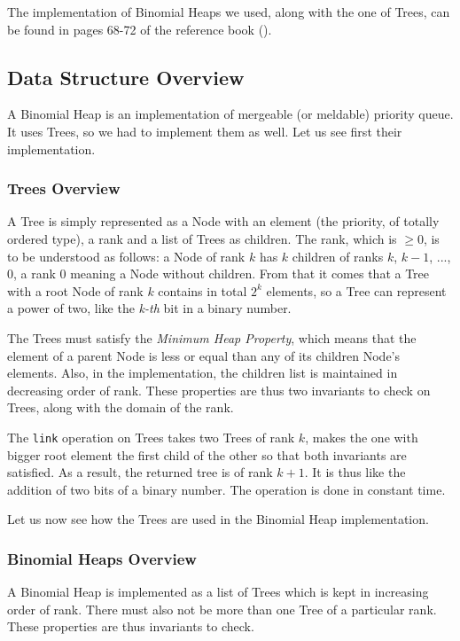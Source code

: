The implementation of Binomial Heaps we used, 
along with the one of Trees, 
can be found in pages 68-72 of the reference book (\cite{Okasaki}).

\subsection{Data Structure Overview}
A Binomial Heap is an implementation of mergeable (or meldable) priority queue.
It uses Trees, so we had to implement them as well.
Let us see first their implementation.

\subsubsection{Trees Overview}
A Tree is simply represented as a Node with an element 
(the priority, of totally ordered type), a rank and a list of Trees as children.
The rank, which is $\geq 0$, is to be understood as follows:
a Node of rank $k$ has $k$ children of ranks $k$, $k-1$, ..., $0$,
a rank $0$ meaning a Node without children.
From that it comes that a Tree with a root Node of rank $k$ 
contains in total $2^k$ elements,
so a Tree can represent a power of two, 
like the \emph{k-th} bit in a binary number.

The Trees must satisfy the \emph{Minimum Heap Property}, 
which means that the element of a parent Node 
is less or equal than any of its children Node's elements.
Also, in the implementation, the children list is maintained in decreasing order of rank.
These properties are thus two invariants to check on Trees,
along with the domain of the rank.

The \verb|link| operation on Trees takes two Trees of rank $k$, 
makes the one with bigger root element the first child of the other
so that both invariants are satisfied.
As a result, the returned tree is of rank $k+1$.
It is thus like the addition of two bits of a binary number.
The operation is done in constant time.

Let us now see how the Trees are used in the Binomial Heap implementation.

\subsubsection{Binomial Heaps Overview}
A Binomial Heap is implemented as a list of Trees
which is kept in increasing order of rank.
There must also not be more than one Tree of a particular rank.
These properties are thus invariants to check.
 
